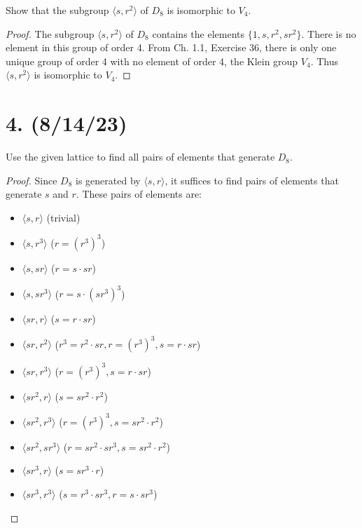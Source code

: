 \documentclass{article}
\begin{document}
Show that the subgroup $\langle s, r^2 \rangle$ of $D_8$ is isomorphic to $V_4$.

\begin{proof}
    The subgroup $\langle s, r^2 \rangle$ of $D_8$ contains the elements $\{ 1, s, r^2, sr^2 \}$. There is no element in this group of order 4. From Ch. 1.1, Exercise 36, there is only one unique group of order 4 with no element of order 4, the Klein group $V_4$. Thus $\langle s, r^2 \rangle$ is isomorphic to $V_4$.
\end{proof}

\section*{4. (8/14/23)}

Use the given lattice to find all pairs of elements that generate $D_8$.

\begin{proof}
    Since $D_8$ is generated by $\langle s, r \rangle$, it suffices to find pairs of elements that generate $s$ and $r$. These pairs of elements are:
    \begin{itemize}[itemsep=0em]
        \item $\langle s, r \rangle$ (trivial)
        \item $\langle s, r^3 \rangle$ ($r = (r^3)^3$)
        \item $\langle s, sr \rangle$ ($r = s \cdot sr$)
        \item $\langle s, sr^3 \rangle$ ($r = s \cdot (sr^3)^3$)
        \item $\langle sr, r \rangle$ ($s = r \cdot sr$)
        \item $\langle sr, r^2 \rangle$ ($r^3 = r^2 \cdot sr, r = (r^3)^3, s = r \cdot sr$)
        \item $\langle sr, r^3 \rangle$ ($r = (r^3)^3, s = r \cdot sr$)
        \item $\langle sr^2, r \rangle$ ($s = sr^2 \cdot r^2$)
        \item $\langle sr^2, r^3 \rangle$ ($r = (r^3)^3, s = sr^2 \cdot r^2$)
        \item $\langle sr^2, sr^3 \rangle$ ($r = sr^2 \cdot sr^3, s = sr^2 \cdot r^2$)
        \item $\langle sr^3, r \rangle$ ($s = sr^3 \cdot r$)
        \item $\langle sr^3, r^3 \rangle$ ($s = r^3 \cdot sr^3, r = s \cdot sr^3$)
    \end{itemize}
\end{proof}
\end{document}
